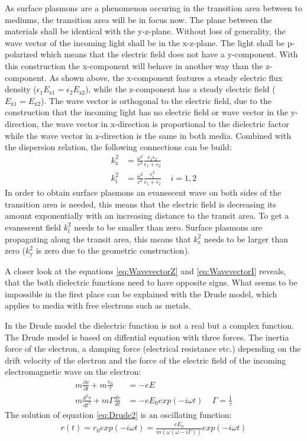 \documentclass[twoside,english,headsepline=on,DIV=11]{scrartcl}
\numberwithin{equation}{section}
\begin{document}
As surface plasmons are a phenomenon occuring in the transition area between to mediums, the transition area will be in focus now. The plane between the materials shall be identical with the y-z-plane. Without loss of generality, the wave vector of the incoming light shall be in the x-z-plane. The light shall be p-polarized which means that the electric field does not have a y-component. With this construction the x-component will behave in another way than the z-component. As shown above, the x-component features a steady electric flux density ($\epsilon_1 E_\text{z1} = \epsilon_2 E_\text{z2}$), while the z-component has a steady electric field ($E_\text{x1} = E_\text{x2}$). The wave vector is orthogonal to the electric field, due to the construction that the incoming light has no electric field or wave vector in the y-direction, the wave vector in x-direction is proportional to the dielectric factor while the wave vector in z-direction is the same in both media. Combined with the dispersion relation, the following connections can be build:
\begin{align}
k_\text{z}^2 &= \frac{\omega^2}{c^2} \frac{\epsilon_1 \epsilon_2}{\epsilon_1 + \epsilon_2} \label{eq:WavevectorZ} \\
k_\text{i}^2 &= \frac{\omega^2}{c^2} \frac{\epsilon_\text{i}^2}{\epsilon_1 + \epsilon_2} \label{eq:WavevectorI} \ \ \ \ \  i=1,2
\end{align}
In order to obtain surface plasmons an evanescent wave on both sides of the transition area is needed, this means that the electric field is decreasing its amount exponentially with an increasing distance to the transit area. To get a evanescent field $k_\text{i}^2$ needs to be smaller than zero. Surface plasmons are propagating along the transit area, this means that $k_\text{z}^2$ needs to be larger than zero ($k_\text{y}^2$ is zero due to the geometric construction). 


A closer look at the equations \ref{eq:WavevectorZ} and \ref{eq:WavevectorI} reveals, that the both dielectric functions need to have opposite signs. What seems to be impossible in the first place can be explained with the Drude model, which applies to media with free electrons such as metals. 

In the Drude model the dielectric function is not a real but a complex function. The Drude model is based on diffential equation with three forces. The inertia force of the electron, a damping force (electrical resistance etc.) depending on the drift velocity of the electron and the force of the electric field of the incoming electromagnetic wave on the electron:
\begin{align}
m \frac{\partial v}{\partial t} + m \frac{v_\text{d}}{\tau} &= -e E \label{eq:Drude1} \\
m \frac{d^2 r}{dt^2} + m \Gamma \frac{dr}{dt} &= -e E_0 exp(-i \omega t) \label{eq:Drude2} \ \ \ \ \ \Gamma = \frac{1}{\tau}
\end{align}
The solution of equation \ref{eq:Drude2} is an oscillating function:
\begin{align}
r(t) = r_0 exp(-i \omega t) = \frac{e E_0}{m(\omega(\omega - i \Gamma))} exp(-i \omega t) \label{eq:DrudeSolution}
\end{align}
\end{document}
